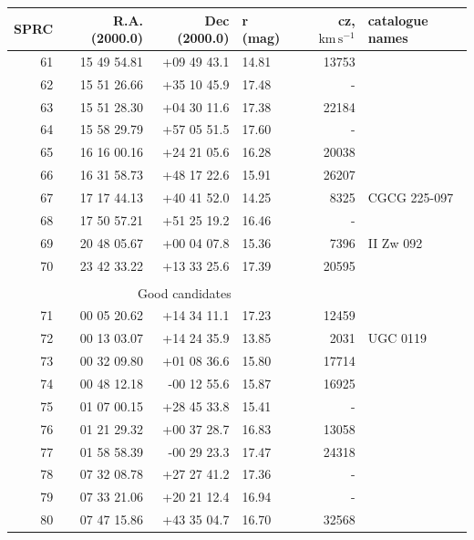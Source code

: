 \documentclass[useAMS,usenatbib]{mn2e}
\newcommand{\km}{\,\mbox{km}\,\mbox{s}^{-1}}
\begin{document}
  \begin{table}
 \contcaption{ }
 \begin{tabular}{rrrlrl}
 \hline
SPRC &  R.A. (2000.0)   &  Dec (2000.0)  &  r (mag)     & cz, $\km$& catalogue names  \\
 \hline
  61 &  15 49 54.81 & +09 49 43.1 &  14.81 &  13753 &                  \\
  62 &  15 51 26.66 & +35 10 45.9 &  17.48 &      - &                  \\
  63 &  15 51 28.30 & +04 30 11.6 &  17.38 &  22184 &                  \\
  64 &  15 58 29.79 & +57 05 51.5 &  17.60 &      - &                  \\
  65 &  16 16 00.16 & +24 21 05.6 &  16.28 &  20038 &                  \\
  66 &  16 31 58.73 & +48 17 22.6 &  15.91 &  26207 &                  \\
  67 &  17 17 44.13 & +40 41 52.0 &  14.25 &   8325 &     CGCG 225-097 \\
  68 &  17 50 57.21 & +51 25 19.2 &  16.46 &      - &                  \\
  69 &  20 48 05.67 & +00 04 07.8 &  15.36 &   7396 &        II Zw 092 \\
  70 &  23 42 33.22 & +13 33 25.6 &  17.39 &  20595 &                  \\
\multicolumn{5}{c}{ }\\
\multicolumn{5}{c}{Good candidates}\\
  71 &  00 05 20.62 & +14 34 11.1 &  17.23 &  12459 &                  \\
  72 &  00 13 03.07 & +14 24 35.9 &  13.85 &   2031 &       UGC 0119   \\
  73 &  00 32 09.80 & +01 08 36.6 &  15.80 &  17714 &                  \\
  74 &  00 48 12.18 & -00 12 55.6 &  15.87 &  16925 &                  \\
  75 &  01 07 00.15 & +28 45 33.8 &  15.41 &      - &                  \\
  76 &  01 21 29.32 & +00 37 28.7 &  16.83 &  13058 &                  \\
  77 &  01 58 58.39 & -00 29 23.3 &  17.47 &  24318 &                  \\
  78 &  07 32 08.78 & +27 27 41.2 &  17.36 &      - &                  \\
  79 &  07 33 21.06 & +20 21 12.4 &  16.94 &      - &                  \\
  80 &  07 47 15.86 & +43 35 04.7 &  16.70 &  32568 &                  \\

\end{tabular}
\end{table}
\end{document}
